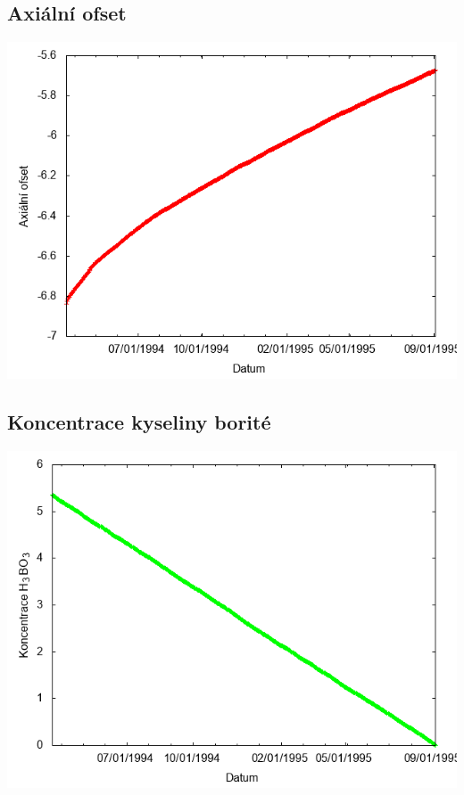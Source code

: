 \documentclass[a4paper,twoside,11pt]{article}
\begin{document}
\subsection*{Axiální ofset}
\begin{center}
\includegraphics[width=.8\textwidth]{graphs/Disneyland_05_ao.png}
\end{center}

\subsection*{Koncentrace kyseliny borité}
\begin{center}
\includegraphics[width=.8\textwidth]{graphs/Disneyland_05_bc.png}
\end{center}
\end{document}
